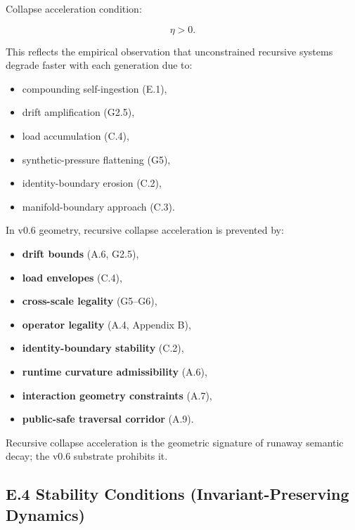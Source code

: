 \medskip

\noindent Collapse acceleration condition:


\[
\eta > 0.
\]



\medskip

\noindent This reflects the empirical observation that unconstrained recursive
systems degrade faster with each generation due to:
\begin{itemize}
    \item compounding self-ingestion (E.1),
    \item drift amplification (G2.5),
    \item load accumulation (C.4),
    \item synthetic-pressure flattening (G5),
    \item identity-boundary erosion (C.2),
    \item manifold-boundary approach (C.3).
\end{itemize}

\medskip

\noindent In v0.6 geometry, recursive collapse acceleration is prevented by:
\begin{itemize}
    \item \textbf{drift bounds} (A.6, G2.5),
    \item \textbf{load envelopes} (C.4),
    \item \textbf{cross-scale legality} (G5–G6),
    \item \textbf{operator legality} (A.4, Appendix B),
    \item \textbf{identity-boundary stability} (C.2),
    \item \textbf{runtime curvature admissibility} (A.6),
    \item \textbf{interaction geometry constraints} (A.7),
    \item \textbf{public-safe traversal corridor} (A.9).
\end{itemize}

\medskip

\noindent Recursive collapse acceleration is the geometric signature of runaway
semantic decay; the v0.6 substrate prohibits it.



\subsection*{E.4 Stability Conditions (Invariant-Preserving Dynamics)}

